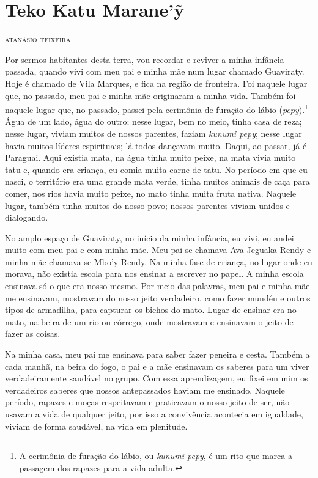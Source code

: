 \chapter*{Teko Katu Marane'ỹ}%

\begin{flushright}
\textsc{atanásio teixeira}
\end{flushright}

Por sermos habitantes desta terra, vou recordar e reviver a minha
infância passada, quando vivi com meu pai e minha mãe num lugar chamado
Guaviraty. Hoje é chamado de Vila Marques, e fica na região de fronteira.
Foi naquele lugar que, no passado, meu pai e minha mãe originaram a
minha vida. Também foi naquele lugar que, no passado, passei pela
cerimônia de furação do lábio (\emph{pepy}).\footnote{A cerimônia de furação do lábio, ou \emph{kunumi pepy}, é um rito que marca a passagem dos rapazes para a vida adulta.} Água de um lado, água do outro; nesse lugar, bem no meio, tinha casa de reza; nesse lugar, viviam
muitos de nossos parentes, faziam \emph{kunumi pepy}; nesse lugar havia
muitos líderes espirituais; lá todos dançavam muito. Daqui, ao passar,
já é Paraguai. Aqui existia mata, na água tinha muito peixe, na mata
vivia muito tatu e, quando era criança, eu comia muita carne de tatu. No
período em que eu nasci, o território era uma grande mata verde, tinha
muitos animais de caça para comer, nos rios havia muito peixe, no mato
tinha muita fruta nativa. Naquele lugar, também tinha muitos do nosso
povo; nossos parentes viviam unidos e dialogando.

No amplo espaço de Guaviraty, no início da minha infância, eu vivi, eu
andei muito com meu pai e com minha mãe. Meu pai se chamava Ava Jeguaka
Rendy e minha mãe chamava-se Mbo'y Rendy. Na minha fase de criança, no
lugar onde eu morava, não existia escola para nos ensinar a escrever no
papel. A minha escola ensinava só o que era nosso mesmo. Por meio das
palavras, meu pai e minha mãe me ensinavam, mostravam do nosso jeito
verdadeiro, como fazer mundéu e outros tipos de armadilha, para capturar
os bichos do mato. Lugar de ensinar era no mato, na beira de um rio ou
córrego, onde mostravam e ensinavam o jeito de fazer as coisas.

Na minha casa, meu pai me ensinava para saber fazer peneira e cesta.
Também a cada manhã, na beira do fogo, o pai e a mãe ensinavam os
saberes para um viver verdadeiramente saudável no grupo. Com essa
aprendizagem, eu fixei em mim os verdadeiros saberes que nossos
antepassados haviam me ensinado. Naquele período, rapazes e moças
respeitavam e praticavam o nosso jeito de ser, não usavam a vida de
qualquer jeito, por isso a convivência acontecia em igualdade, viviam de
forma saudável, na vida em plenitude.

